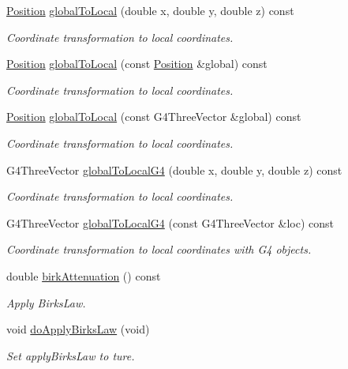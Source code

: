 \begin{DoxyCompactItemize}
\hyperlink{namespace_d_d4hep_1_1_geometry_a55083902099d03506c6db01b80404900}{Position} \hyperlink{class_d_d4hep_1_1_simulation_1_1_geant4_step_handler_a95c39168e580011edf1a247a1f2debb0}{global\+To\+Local} (double x, double y, double z) const
\begin{DoxyCompactList}\small\item\em Coordinate transformation to local coordinates. \end{DoxyCompactList}\item 
\hyperlink{namespace_d_d4hep_1_1_geometry_a55083902099d03506c6db01b80404900}{Position} \hyperlink{class_d_d4hep_1_1_simulation_1_1_geant4_step_handler_acaf616fb9b9baa3c16a41995f810b985}{global\+To\+Local} (const \hyperlink{namespace_d_d4hep_1_1_geometry_a55083902099d03506c6db01b80404900}{Position} \&global) const
\begin{DoxyCompactList}\small\item\em Coordinate transformation to local coordinates. \end{DoxyCompactList}\item 
\hyperlink{namespace_d_d4hep_1_1_geometry_a55083902099d03506c6db01b80404900}{Position} \hyperlink{class_d_d4hep_1_1_simulation_1_1_geant4_step_handler_a9d7db51a7a7d6bc11853a4dddb49cc1d}{global\+To\+Local} (const G4\+Three\+Vector \&global) const
\begin{DoxyCompactList}\small\item\em Coordinate transformation to local coordinates. \end{DoxyCompactList}\item 
G4\+Three\+Vector \hyperlink{class_d_d4hep_1_1_simulation_1_1_geant4_step_handler_a2f746a7669e0ab4e52f39e4fbc2cd742}{global\+To\+Local\+G4} (double x, double y, double z) const
\begin{DoxyCompactList}\small\item\em Coordinate transformation to local coordinates. \end{DoxyCompactList}\item 
G4\+Three\+Vector \hyperlink{class_d_d4hep_1_1_simulation_1_1_geant4_step_handler_ad606e21ce6d279416e75f3400e825207}{global\+To\+Local\+G4} (const G4\+Three\+Vector \&loc) const
\begin{DoxyCompactList}\small\item\em Coordinate transformation to local coordinates with G4 objects. \end{DoxyCompactList}\item 
double \hyperlink{class_d_d4hep_1_1_simulation_1_1_geant4_step_handler_af07e4f457781ff9350953c89e986fb9e}{birk\+Attenuation} () const
\begin{DoxyCompactList}\small\item\em Apply Birks\+Law. \end{DoxyCompactList}\item 
void \hyperlink{class_d_d4hep_1_1_simulation_1_1_geant4_step_handler_a67ef04d7d190e233ae9f3a23d5aedf33}{do\+Apply\+Birks\+Law} (void)
\begin{DoxyCompactList}\small\item\em Set apply\+Birks\+Law to ture. \end{DoxyCompactList}\end{DoxyCompactItemize}
